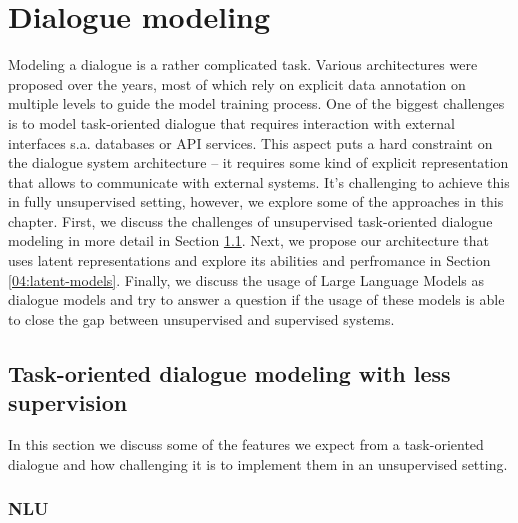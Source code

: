 \chapter{Dialogue modeling}%
\label{chap:modeling}
Modeling a dialogue is a rather complicated task.
Various architectures were proposed over the years, most of which rely on explicit data annotation on multiple levels to guide the model training process.
One of the biggest challenges is to model task-oriented dialogue that requires interaction with external interfaces s.a. databases or API services.
This aspect puts a hard constraint on the dialogue system architecture -- it requires some kind of explicit representation that allows to communicate with external systems.
It's challenging to achieve this in fully unsupervised setting, however, we explore some of the approaches in this chapter.
First, we discuss the challenges of unsupervised task-oriented dialogue modeling in more detail in Section \ref{04:to-unsup}.
Next, we propose our architecture that uses latent representations and explore its abilities and perfromance in Section \ref{04:latent-models}.
Finally, we discuss the usage of Large Language Models as dialogue models and try to answer a question if the usage of these models is able to close the gap between unsupervised and supervised systems.

\section{Task-oriented dialogue modeling with less supervision}
\label{04:to-unsup}
In this section we discuss some of the features we expect from a task-oriented dialogue and how challenging it is to implement them in an unsupervised setting.

\subsection{NLU}
